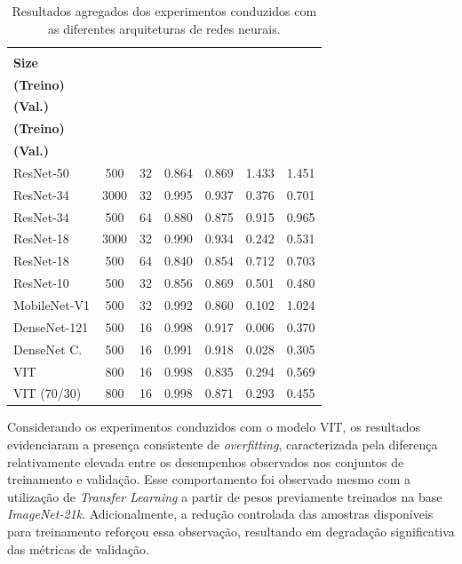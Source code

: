 \begin{table}[h]
	\centering
	\caption{Resultados agregados dos experimentos conduzidos com as diferentes arquiteturas de redes neurais.}
	\label{tab:comparacao_geral}
	\renewcommand{\arraystretch}{1.3}
	
	\begin{tabular}{l|c|c|c|c|c|c}
		\toprule
		
		\makecell{\textbf{Modelo}}&
		\makecell{\textbf{Épocas}}&
		\makecell{\textbf{Batch}\\ \textbf{Size}}&
		\makecell{\textbf{Acurácia}\\ \textbf{(Treino)}} &
		\makecell{\textbf{Acurácia}\\ \textbf{(Val.)}} &
		\makecell{\textbf{Perda}\\ \textbf{(Treino)}} &
		\makecell{\textbf{Perda}\\ \textbf{(Val.)}} \\
		\midrule

		ResNet-50 & 500 & 32 & 0.864 & 0.869 & 1.433 & 1.451 \\
		ResNet-34 & 3000 & 32 & 0.995 & 0.937 & 0.376 & 0.701 \\
		ResNet-34 & 500 & 64 & 0.880 & 0.875 & 0.915 & 0.965 \\
		ResNet-18 & 3000 & 32 & 0.990 & 0.934 & 0.242 & 0.531 \\
		ResNet-18 & 500 & 64 & 0.840 & 0.854 & 0.712 & 0.703 \\
		ResNet-10 & 500 & 32 & 0.856 & 0.869 & 0.501 & 0.480 \\
		MobileNet-V1 & 500 & 32 & 0.992 & 0.860 & 0.102 & 1.024 \\
		DenseNet-121 & 500 & 16 & 0.998 & 0.917 & 0.006 & 0.370 \\
		DenseNet C. & 500 & 16 & 0.991 & 0.918 & 0.028 & 0.305 \\
		\acs{VIT} & 800 & 16 & 0.998 & 0.835 & 0.294 & 0.569 \\
		\acs{VIT} (70/30) & 800 & 16 & 0.998 & 0.871 & 0.293 & 0.455 \\
		
		\bottomrule
		
	\end{tabular}
\end{table}

Considerando os experimentos conduzidos com o modelo \acs{VIT}, os resultados evidenciaram a presença consistente de \textit{overfitting}, caracterizada pela diferença relativamente elevada entre os desempenhos observados nos conjuntos de treinamento e validação. Esse comportamento foi observado mesmo com a utilização de \textit{Transfer Learning} a partir de pesos previamente treinados na base \textit{ImageNet-21k}. Adicionalmente, a redução controlada das amostras disponíveis para treinamento reforçou essa observação, resultando em degradação significativa das métricas de validação.

